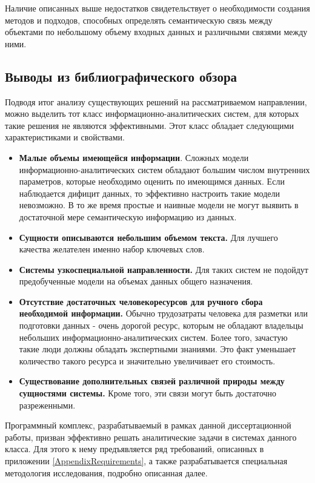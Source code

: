 Наличие описанных выше недостатков свидетельствует о необходимости создания методов и подходов, способных определять семантическую связь между объектами по небольшому объему входных данных и различными связями между ними.

\subsection{Выводы из библиографического обзора} \label{related_work_concl}

Подводя итог анализу существующих решений на рассматриваемом направлении, можно выделить тот класс информационно-аналитических систем, для которых такие решения не являются эффективными. Этот класс обладает следующими характеристиками и свойствами.

\begin{itemize}
    \item \textbf{Малые объемы имеющейся информации}. Сложных  модели информационно-аналитических систем обладают большим числом внутренних параметров, которые необходимо оценить по имеющимся данных. Если наблюдается дифицит данных, то эффективно настроить такие модели невозможно. В то же время простые и наивные модели не могут выявить в достаточной мере семантическую информацию из данных.
    \item \textbf{Сущности описываются небольшим объемом текста.} Для лучшего качества желателен именно набор ключевых слов.
    \item \textbf{Системы узкоспециальной направленности.} Для таких систем не подойдут предобученные модели на объемах данных общего назначения.
    \item \textbf{Отсутствие достаточных человекоресурсов для ручного сбора необходимой информации.} Обычно трудозатраты человека для разметки или подготовки данных - очень дорогой ресурс, которым не обладают владельцы небольших информационно-аналитических систем. Более того, зачастую такие люди должны обладать экспертными знаниями. Это факт уменьшает количество такого ресурса и значительно увеличивает его стоимость.
    \item \textbf{Существование дополнительных связей различной природы между сущностями системы.} Кроме того, эти связи могут быть достаточно разреженными.
\end{itemize}

Программный комплекс, разрабатываемый в рамках данной диссертационной работы, призван эффективно решать аналитические задачи в системах данного класса. Для этого к нему предъявляется ряд требований, описанных в приложении \ref{AppendixRequirements}, а также разрабатывается специальная методология исследования, подробно описанная далее.


